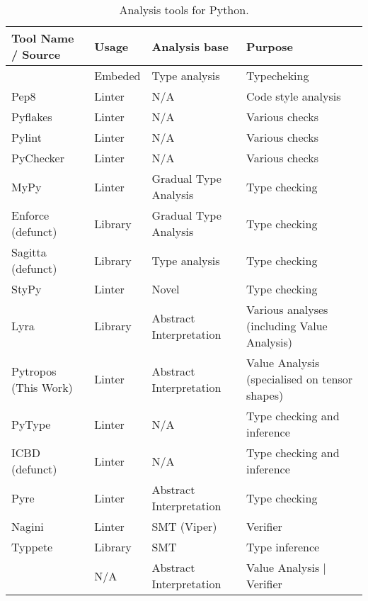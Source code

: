 \begin{sidewaystable}[p]
\centering
\begin{threeparttable}
\begin{longtable}[]{|l|l|l|l|}
  \caption{Analysis tools for Python.
  }\label{relatedworktable}\tabularnewline
  \toprule
  Tool Name / Source & Usage & Analysis base & Purpose \tabularnewline
  \midrule
  \endhead
    \textcite{cannon_localized_2005}                     & Embeded & Type analysis           & Typecheking     \tabularnewline
    Pep8\tnote{0}                                        & Linter  & N/A                     & Code style analysis \tabularnewline
    Pyflakes\tnote{1}                                    & Linter  & N/A                     & Various checks  \tabularnewline
    Pylint \autocite{thenaultpylint}                     & Linter  & N/A                     & Various checks  \tabularnewline
    PyChecker \autocite{norwitzpychecker}                & Linter  & N/A                     & Various checks  \tabularnewline
    MyPy \autocite{lehtosalo2016mypy}                    & Linter  & Gradual Type Analysis   & Type checking   \tabularnewline
    Enforce\tnote{2}\tnote{+} (defunct)                  & Library & Gradual Type Analysis   & Type checking               \tabularnewline
    Sagitta\tnote{3}\tnote{+} (defunct)                  & Library & Type analysis           & Type checking               \tabularnewline
    StyPy \autocite{ortin_towards_2015}                  & Linter  & Novel                   & Type checking               \tabularnewline
    Lyra\tnote{4}                                        & Library & Abstract Interpretation & Various analyses (including Value Analysis) \tabularnewline
    Pytropos\tnote{5} (This Work)                        & Linter  & Abstract Interpretation & Value Analysis (specialised on tensor shapes) \tabularnewline
    PyType\tnote{6}                                      & Linter  & N/A                     & Type checking and inference \tabularnewline
    ICBD\tnote{7} (defunct)                              & Linter  & N/A                     & Type checking and inference \tabularnewline
    Pyre\tnote{8}                                        & Linter  & Abstract Interpretation & Type checking               \tabularnewline
    Nagini\tnote{9} \autocite{eilers_nagini_2018}        & Linter  & SMT (Viper)             & Verifier                    \tabularnewline
    Typpete\tnote{10} \autocite{hassan_maxsmt-based_2018} & Library & SMT                     & Type inference              \tabularnewline
    \textcite{fromherz_static_2018}\tnote{*}             & N/A     & Abstract Interpretation & Value Analysis | Verifier   \tabularnewline

\end{longtable}
\end{threeparttable}
\end{sidewaystable}
